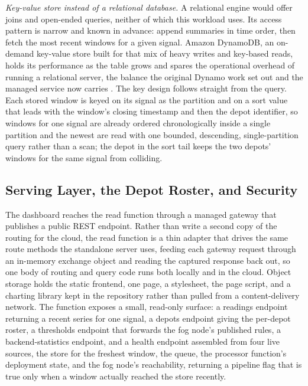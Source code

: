 \documentclass[conference]{IEEEtran}
\begin{document}
\textit{Key-value store instead of a relational database.} A relational engine would offer joins and open-ended queries, neither of which this workload uses. Its access pattern is narrow and known in advance: append summaries in time order, then fetch the most recent windows for a given signal. Amazon DynamoDB, an on-demand key-value store built for that mix of heavy writes and key-based reads, holds its performance as the table grows and spares the operational overhead of running a relational server, the balance the original Dynamo work set out and the managed service now carries \cite{decandia2007, elhemali2022}. The key design follows straight from the query. Each stored window is keyed on its signal as the partition and on a sort value that leads with the window's closing timestamp and then the depot identifier, so windows for one signal are already ordered chronologically inside a single partition and the newest are read with one bounded, descending, single-partition query rather than a scan; the depot in the sort tail keeps the two depots' windows for the same signal from colliding.

\subsection{Serving Layer, the Depot Roster, and Security}

The dashboard reaches the read function through a managed gateway that publishes a public REST endpoint. Rather than write a second copy of the routing for the cloud, the read function is a thin adapter that drives the same route methods the standalone server uses, feeding each gateway request through an in-memory exchange object and reading the captured response back out, so one body of routing and query code runs both locally and in the cloud. Object storage holds the static frontend, one page, a stylesheet, the page script, and a charting library kept in the repository rather than pulled from a content-delivery network. The function exposes a small, read-only surface: a readings endpoint returning a recent series for one signal, a depots endpoint giving the per-depot roster, a thresholds endpoint that forwards the fog node's published rules, a backend-statistics endpoint, and a health endpoint assembled from four live sources, the store for the freshest window, the queue, the processor function's deployment state, and the fog node's reachability, returning a pipeline flag that is true only when a window actually reached the store recently.
\end{document}

